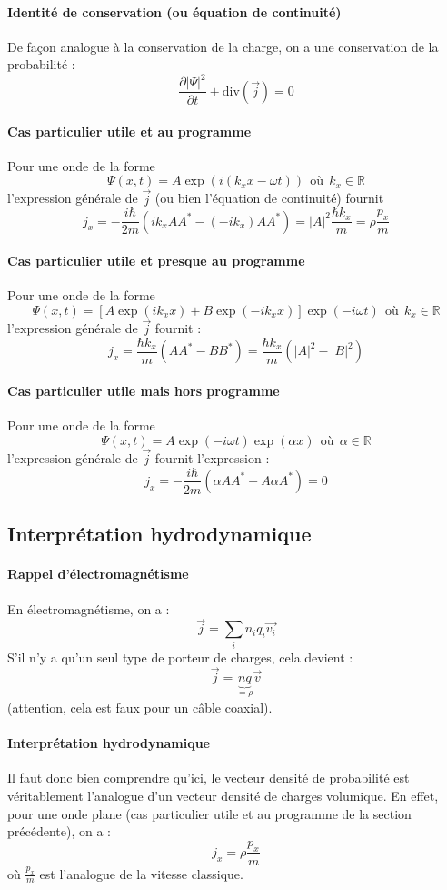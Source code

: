 \documentclass[french]{book}
\theoremstyle{plain}
\theoremstyle{definition}
\theoremstyle{remark}
\newcommand{\R}{\mathbb{R}}
\newcommand{\st}{^*}
\renewcommand{\div}{\text{div}}
\begin{document}
\paragraph{Identité de conservation (ou équation de continuité)} De façon analogue à la conservation de la charge, on a une conservation de la probabilité : $$\frac{\partial \lvert\Psi\rvert^2}{\partial t}+\div\left(\overrightarrow{j}\right)=0$$
\paragraph{Cas particulier utile et au programme} Pour une onde de la forme $$\Psi(x,t)=A\exp(i(k_x x-\omega t)) \ \ \text{où} \ \ k_x\in\R$$ l'expression générale de $\overrightarrow{j}$ (ou bien l'équation de continuité) fournit $$j_x=-\frac{i\hbar}{2m}\left(ik_xAA\st-(-ik_x)AA\st\right)=\lvert A\rvert^2\frac{\hbar k_x}{m}=\rho\frac{p_x}{m}$$
\paragraph{Cas particulier utile et presque au programme}
Pour une onde de la forme $$\Psi(x,t)=\left[A\exp(ik_x x)+B\exp(-ik_x x)\right]\exp(-i\omega t) \ \ \text{où} \ \ k_x\in\R$$ l'expression générale de $\overrightarrow{j}$ fournit : $$j_x=\frac{\hbar k_x}{m}\left(AA\st-BB\st\right)=\frac{\hbar k_x}{m}(\lvert A\rvert^2-\lvert B\rvert^2)$$
\paragraph{Cas particulier utile mais hors programme}
Pour une onde de la forme $$\Psi(x,t)=A\exp(-i\omega t)\exp(\alpha x)\ \ \text{où} \ \ \alpha\in\R$$ l'expression générale de $\overrightarrow{j}$ fournit l'expression : $$j_x=-\frac{i\hbar}{2m}\left(\alpha AA\st-A\alpha A\st\right)=0$$
\subsection{Interprétation hydrodynamique}
\paragraph{Rappel d'électromagnétisme} En électromagnétisme, on a : $$\overrightarrow{j}=\sum_i n_i q_i \overrightarrow{v_i}$$ S'il n'y a qu'un seul type de porteur de charges, cela devient : $$\overrightarrow{j}=\underbrace{nq}_{=\rho}\overrightarrow{v}$$ (attention, cela est faux pour un câble coaxial).
\paragraph{Interprétation hydrodynamique} Il faut donc bien comprendre qu'ici, le vecteur densité de probabilité est véritablement l'analogue d'un vecteur densité de charges volumique. En effet, pour une onde plane (cas particulier utile et au programme de la section précédente), on a : $$j_x=\rho\frac{p_x}{m}$$ où $\displaystyle\frac{p_x}{m}$ est l'analogue de la vitesse classique.
\end{document}
